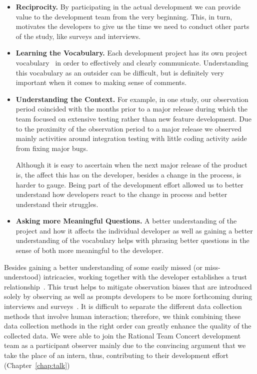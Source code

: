 \begin{itemize}
\item\textbf{Reciprocity.} By participating in the actual development we can provide value to the development team from the very beginning.
This, in turn, motivates the developers to give us the time we need to conduct other parts of the study, like surveys and interviews.
\item\textbf{Learning the Vocabulary.} Each development project has its own project vocabulary~\cite{espinosa2007:team_knowledge} in order to effectively and clearly communicate. 
Understanding this vocabulary as an outsider can be difficult, but is definitely very important when it comes to making sense of comments.
\item\textbf{Understanding the Context.} For example, in one study, our observation period coincided with the months prior to a major release during which the team focused on extensive testing rather than new feature development. 
Due to the proximity of the observation period to a major release we observed mainly activities around integration testing with little coding activity aside from fixing major bugs.

Although it is easy to ascertain when the next major release of the product is, the affect this has on the developer, besides a change in the process, is harder to gauge.
Being part of the development effort allowed us to better understand how developers react to the change in process and better understand their struggles.

\item\textbf{Asking more Meaningful Questions.} A better understanding of the project and how it affects the individual developer as well as gaining a better understanding of  the vocabulary helps with phrasing better questions in the sense of both more meaningful to the developer.
\end{itemize}

Besides gaining a better understanding of some easily missed (or miss-understood) intricacies, working together with the developer establishes a trust relationship~\cite{letherbridge:ese2005}.
This trust helps to mitigate observation biases that are introduced solely by observing as well as prompts developers to be more forthcoming during interviews and surveys~\cite{letherbridge:ese2005}.
It is difficult to separate the different data collection methods that involve human interaction; therefore, we think combining these data collection methods in the right order can greatly enhance the quality of the collected data.
We were able to join the Rational Team Concert development team as a participant observer mainly due to the convincing argument that we take the place of an intern, thus, contributing to their development effort (Chapter~\ref{chap:talk})

